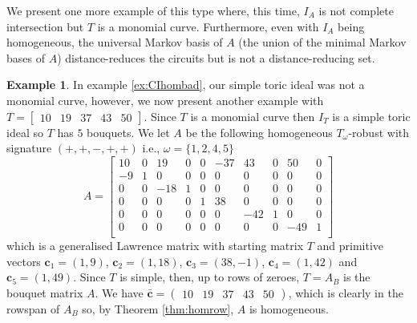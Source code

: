 \documentclass[a4paper, 12pt]{article}
\theoremstyle{plain}
\theoremstyle{definition}
\newtheorem{example}[theorem]{Example}
\theoremstyle{remark}
\begin{document}
We present one more example of this type where, this time, $I_A$ is not complete intersection but $T$ is a monomial curve. Furthermore, even with $I_A$ being homogeneous, the universal Markov basis of $A$ (the union of the minimal Markov bases of $A$) distance-reduces the circuits but is not a distance-reducing set.




\begin{example} \label{ex:CIhombad2}
In example \ref{ex:CIhombad}, our simple toric ideal was not a monomial curve, however, we now present another example with $T=\begin{bmatrix}10&19&37&43&50\end{bmatrix}$. Since $T$ is a monomial curve then $I_T$ is a simple toric ideal so $T$ has $5$ bouquets. We let $A$ be the following homogeneous $T_{\omega}$-robust with signature $(+,+,-,+,+)$ i.e., $\omega=\{1,2,4,5\}$
$$A=\begin{bmatrix}
    10&0&19&0&0&-37&43&0&50&0\\
    -9&1&0&0&0&0&0&0&0&0\\
    0&0&-18&1&0&0&0&0&0&0\\
    0&0&0&0&1&38&0&0&0&0\\
    0&0&0&0&0&0&-42&1&0&0\\
    0&0&0&0&0&0&0&0&-49&1\\
\end{bmatrix}$$
which is a generalised Lawrence matrix with starting matrix $T$ and primitive vectors $\mathbf{c}_1=(1,9)$, $\mathbf{c}_2=(1,18)$, $\mathbf{c}_3=(38,-1)$, $\mathbf{c}_4=(1,42)$ and $\mathbf{c}_5=(1,49)$. Since $T$ is simple, then, up to rows of zeroes, $T=A_B$ is the bouquet matrix $A$. We have $\mathbf{\bar c}=\begin{pmatrix}10&19&37&43&50\end{pmatrix}$, which is clearly in the rowspan of $A_B$ so, by Theorem \ref{thm:homrow}, $A$ is homogeneous.




\end{example}
\end{document}
